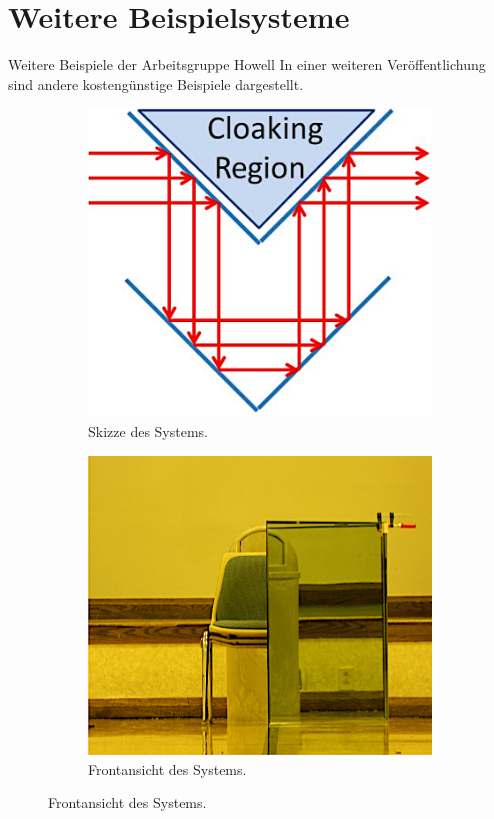 \section{Weitere Beispielsysteme}
\begin{frame}{Weitere Beispiele der Arbeitsgruppe Howell}
    In einer weiteren Ver\"offentlichung \cite{rochester2} sind andere kosteng\"unstige Beispiele dargestellt.
    \begin{figure}
        \centering
        \begin{subfigure}{0.48\textwidth}
            \centering
            \caption{Skizze des Systems.}
            \includegraphics[height=0.6\textheight]{images/spiegel-skizze.png}
        \end{subfigure}
        \begin{subfigure}{0.48\textwidth}
            \centering
            \caption{Frontansicht des Systems.}
            \includegraphics[height=0.6\textheight]{images/spiegel-vorne.png}

\end{subfigure}
\end{figure}
\end{frame}
